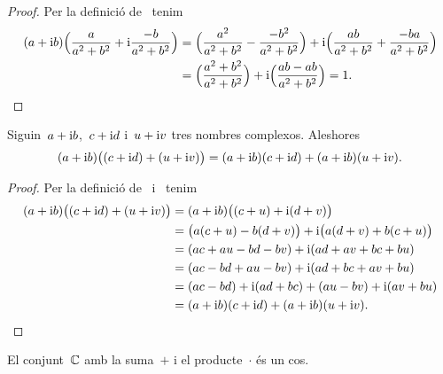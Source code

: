 \documentclass[../Apunts.tex]{subfiles}
\begin{document}
	\begin{proof}
		Per la definició de~ tenim
		\begin{align*}
			(a+\mathrm{i} b)\Big(\frac{a}{a^{2}+b^{2}}+\mathrm{i}\frac{-b}{a^{2}+b^{2}}\Big)
			&=\Big(\frac{a^{2}}{a^{2}+b^{2}}-\frac{-b^{2}}{a^{2}+b^{2}}\Big)
			+\mathrm{i}\Big(\frac{ab}{a^{2}+b^{2}}+\frac{-ba}{a^{2}+b^{2}}\Big) \\
			&=\Big(\frac{a^{2}+b^{2}}{a^{2}+b^{2}}\Big)
			+\mathrm{i}\Big(\frac{ab-ab}{a^{2}+b^{2}}\Big)=1.
			\qedhere
		\end{align*}
	\end{proof}
	\begin{proposition}
		\label{prop:distribuitva del producte respecte la suma de nombres complexos}
		Siguin~\(a+\mathrm{i} b\),~\(c+\mathrm{i} d\) i~\(u+\mathrm{i} v\) tres nombres complexos.
		Aleshores
		\[
			(a+\mathrm{i} b)\big((c+\mathrm{i} d)+(u+\mathrm{i} v)\big)
			=(a+\mathrm{i} b)(c+\mathrm{i} d)+(a+\mathrm{i} b)(u+\mathrm{i} v).
		\]
	\end{proposition}
	\begin{proof}
		Per la definició de~
		i~ tenim
		\begin{align*}
			(a+\mathrm{i} b)\big((c+\mathrm{i} d)+(u+\mathrm{i} v)\big)
			&=(a+\mathrm{i} b)\big((c+u)+\mathrm{i}(d+v)\big) \\
			&=\big(a(c+u)-b(d+v)\big)+\mathrm{i}\big(a(d+v)+b(c+u)\big) \\
			&=(ac+au-bd-bv)+\mathrm{i}(ad+av+bc+bu) \\
			&=(ac-bd+au-bv)+\mathrm{i}(ad+bc+av+bu)\\
			&=(ac-bd)+\mathrm{i}(ad+bc)+(au-bv)+\mathrm{i}(av+bu) \\
			&=(a+\mathrm{i} b)(c+\mathrm{i} d)+(a+\mathrm{i} b)(u+\mathrm{i} v).
			\qedhere
		\end{align*}
	\end{proof}
	\begin{corollary}
		\label{cor:els complexos formen un cos}
		El conjunt~\(\mathbb{C}\) amb la suma~\(+\)
		i el producte~\(\cdot\) és un cos.
	\end{corollary}
\end{document}
